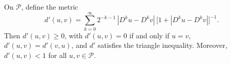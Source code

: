 On $\mathcal{P}$, define the metric
$$d'(u, v) = \sum_{k=0}^{\infty} 2^{-k-1} \, |D^k u - D^k v| \, \bigl[1 + |D^k u - D^k v|\bigr]^{-1}.$$
Then $d'(u, v) \geq 0$, with $d'(u, v) = 0$ if and only if $u = v$, $d'(u, v) = d'(v, u)$, and $d'$ satisfies the triangle inequality. Moreover, $d'(u, v) < 1$ for all $u, v \in \mathcal{P}$.
